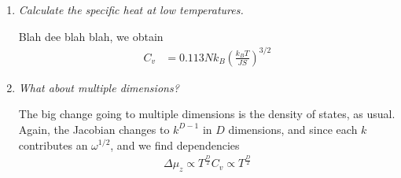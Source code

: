 \documentclass[10pt]{report}
\begin{document}
\begin{enumerate}[1.]
    \item \emph{Calculate the specific heat at low temperatures.}

        Blah dee blah blah, we obtain
        \begin{align}
            C_v &= 0.113 N k_B \left( \frac{k_BT}{JS} \right)^{3/2}
        \end{align}

    \item \emph{What about multiple dimensions?}

        The big change going to multiple dimensions is the density of states, as usual. Again, the Jacobian changes to $k^{D-1}$ in $D$ dimensions, and since each $k$ contributes an $\omega^{1/2}$, and we find dependencies
        \begin{align}
            \Delta \mu_z \propto T^{\frac{D}{2}}
            C_v \propto T^{\frac{D}{2}}
        \end{align}
\end{enumerate}
\end{document}
